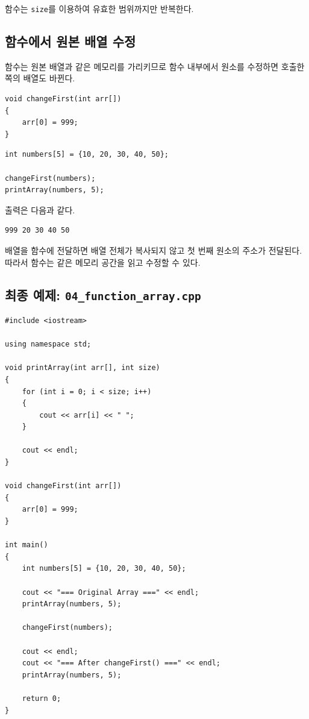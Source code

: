 \documentclass[11pt,a4paper]{article}
\begin{document}
함수는 \texttt{size}를 이용하여 유효한 범위까지만 반복한다.

\subsection{함수에서 원본 배열 수정}

함수는 원본 배열과 같은 메모리를 가리키므로 함수 내부에서 원소를 수정하면 호출한 쪽의 배열도 바뀐다.

\begin{lstlisting}
void changeFirst(int arr[])
{
    arr[0] = 999;
}
\end{lstlisting}

\begin{lstlisting}
int numbers[5] = {10, 20, 30, 40, 50};

changeFirst(numbers);
printArray(numbers, 5);
\end{lstlisting}

출력은 다음과 같다.

\begin{verbatim}
999 20 30 40 50
\end{verbatim}

\begin{importantbox}
배열을 함수에 전달하면 배열 전체가 복사되지 않고 첫 번째 원소의 주소가 전달된다. 따라서 함수는 같은 메모리 공간을 읽고 수정할 수 있다.
\end{importantbox}

\subsection{최종 예제: \texttt{04\_function\_array.cpp}}

\begin{lstlisting}
#include <iostream>

using namespace std;

void printArray(int arr[], int size)
{
    for (int i = 0; i < size; i++)
    {
        cout << arr[i] << " ";
    }

    cout << endl;
}

void changeFirst(int arr[])
{
    arr[0] = 999;
}

int main()
{
    int numbers[5] = {10, 20, 30, 40, 50};

    cout << "=== Original Array ===" << endl;
    printArray(numbers, 5);

    changeFirst(numbers);

    cout << endl;
    cout << "=== After changeFirst() ===" << endl;
    printArray(numbers, 5);

    return 0;
}
\end{lstlisting}
\end{document}
